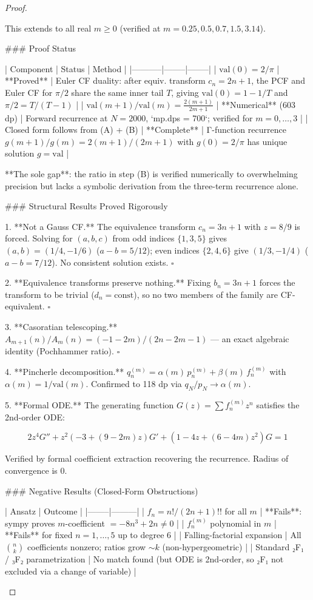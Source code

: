 \begin{theorem}
\begin{lemma}
\begin{proposition}
\begin{corollary}
\begin{proof}
\begin{remark}
This extends to all real $m \geq 0$ (verified at $m = 0.25, 0.5, 0.7, 1.5, 3.14$).

### Proof Status

| Component | Status | Method |
|-----------|--------|--------|
| $\text{val}(0) = 2/\pi$ | **Proved** | Euler CF duality: after equiv. transform $c_n = 2n{+}1$, the PCF and Euler CF for $\pi/2$ share the same inner tail $T$, giving $\text{val}(0) = 1 - 1/T$ and $\pi/2 = T/(T{-}1)$ |
| $\text{val}(m{+}1)/\text{val}(m) = \frac{2(m+1)}{2m+1}$ | **Numerical** (603 dp) | Forward recurrence at $N = 2000$, `mp.dps = 700`; verified for $m = 0,\ldots,3$ |
| Closed form follows from (A) + (B) | **Complete** | Γ-function recurrence $g(m{+}1)/g(m) = 2(m{+}1)/(2m{+}1)$ with $g(0) = 2/\pi$ has unique solution $g = \text{val}$ |

**The sole gap**: the ratio in step (B) is verified numerically to overwhelming precision but lacks a symbolic derivation from the three-term recurrence alone.

### Structural Results Proved Rigorously

1. **Not a Gauss CF.** The equivalence transform $c_n = 3n{+}1$ with $z = 8/9$ is forced. Solving for $(a,b,c)$ from odd indices $\{1,3,5\}$ gives $(a,b) = (1/4, -1/6)$ ($a{-}b = 5/12$); even indices $\{2,4,6\}$ give $(1/3, -1/4)$ ($a{-}b = 7/12$). No consistent solution exists. $\square$

2. **Equivalence transforms preserve nothing.** Fixing $b_n = 3n{+}1$ forces the transform to be trivial ($d_n = \text{const}$), so no two members of the family are CF-equivalent. $\square$

3. **Casoratian telescoping.** $A_{m+1}(n)/A_m(n) = (-1{-}2m)/(2n{-}2m{-}1)$ — an exact algebraic identity (Pochhammer ratio). $\square$

4. **Pincherle decomposition.** $q_n^{(m)} = \alpha(m)\,p_n^{(m)} + \beta(m)\,f_n^{(m)}$ with $\alpha(m) = 1/\text{val}(m)$. Confirmed to 118 dp via $q_N/p_N \to \alpha(m)$.

5. **Formal ODE.** The generating function $G(z) = \sum f_n^{(m)} z^n$ satisfies the 2nd-order ODE:

$$2z^4 G'' + z^2\!\left(-3 + (9{-}2m)z\right)G' + \left(1 - 4z + (6{-}4m)z^2\right)G = 1$$

Verified by formal coefficient extraction recovering the recurrence. Radius of convergence is 0.

### Negative Results (Closed-Form Obstructions)

| Ansatz | Outcome |
|--------|---------|
| $f_n = n!/(2n{+}1)!!$ for all $m$ | **Fails**: sympy proves $m$-coefficient $= -8n^3 + 2n \neq 0$ |
| $f_n^{(m)}$ polynomial in $m$ | **Fails** for fixed $n = 1,\ldots,5$ up to degree 6 |
| Falling-factorial expansion | All $\binom{n}{k}$ coefficients nonzero; ratios grow $\sim k$ (non-hypergeometric) |
| Standard ₂F₁ / ₃F₂ parametrization | No match found (but ODE is 2nd-order, so ₂F₁ not excluded via a change of variable) |


\end{remark}
\end{proof}
\end{corollary}
\end{proposition}
\end{lemma}
\end{theorem}
